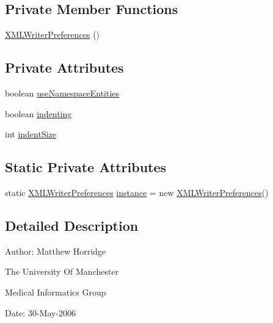 \subsection*{Private Member Functions}
\begin{DoxyCompactItemize}
\item 
\hyperlink{classorg_1_1coode_1_1xml_1_1_x_m_l_writer_preferences_aae011b863becdfa66a66b97a673bd73d}{X\-M\-L\-Writer\-Preferences} ()
\end{DoxyCompactItemize}
\subsection*{Private Attributes}
\begin{DoxyCompactItemize}
\item 
boolean \hyperlink{classorg_1_1coode_1_1xml_1_1_x_m_l_writer_preferences_a8a87140e3e56abb5f86297dc6582be8c}{use\-Namespace\-Entities}
\item 
boolean \hyperlink{classorg_1_1coode_1_1xml_1_1_x_m_l_writer_preferences_a3502f467f3fc85005ab3ab0c6e51c529}{indenting}
\item 
int \hyperlink{classorg_1_1coode_1_1xml_1_1_x_m_l_writer_preferences_ab2c39d4bf104b8095decfc3d812b2cee}{indent\-Size}
\end{DoxyCompactItemize}
\subsection*{Static Private Attributes}
\begin{DoxyCompactItemize}
\item 
static \hyperlink{classorg_1_1coode_1_1xml_1_1_x_m_l_writer_preferences}{X\-M\-L\-Writer\-Preferences} \hyperlink{classorg_1_1coode_1_1xml_1_1_x_m_l_writer_preferences_a27584ea2e4a9c9425f41e7a5580b573c}{instance} = new \hyperlink{classorg_1_1coode_1_1xml_1_1_x_m_l_writer_preferences}{X\-M\-L\-Writer\-Preferences}()
\end{DoxyCompactItemize}


\subsection{Detailed Description}
Author\-: Matthew Horridge\par
 The University Of Manchester\par
 Medical Informatics Group\par
 Date\-: 30-\/\-May-\/2006\par
\par
 

